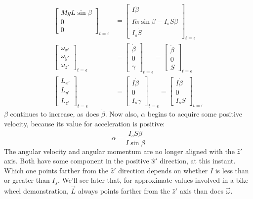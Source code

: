 \documentclass[10pt]{article}
\begin{document}
\begin{align*}
    \begin{bmatrix}
        MgL\sin\beta \\
        0 \\
        0 
    \end{bmatrix}_{t=\epsilon}
    &=
    \begin{bmatrix}
        I\ddot\beta \\
        I\ddot\alpha\sin\beta - I_sS\dot\beta\\
        I_s\dot S 
    \end{bmatrix}_{t=\epsilon}
    \\
    \begin{bmatrix}
        \omega_{x'} \\
        \omega_{y'} \\
        \omega_{z'}
    \end{bmatrix}_{t=\epsilon}
    &=
    \begin{bmatrix}
        \dot\beta \\
        0 \\
        \dot\gamma
    \end{bmatrix}_{t=\epsilon}
    =
    \begin{bmatrix}
        \dot\beta \\
        0 \\
        S
    \end{bmatrix}_{t=\epsilon}
    \\
    \begin{bmatrix}
        L_{x'} \\
        L_{y'} \\
        L_{z'}
    \end{bmatrix}_{t=\epsilon}
    &=
    \begin{bmatrix}
        I\dot\beta \\
        0 \\
        I_s\dot\gamma
    \end{bmatrix}_{t=\epsilon}
    =
    \begin{bmatrix}
        I\dot\beta \\
        0 \\
        I_sS
    \end{bmatrix}_{t=\epsilon}
\end{align*}
$\beta$ continues to increase, as does $\dot\beta$. 
Now also, $\alpha$ begins to acquire some positive velocity, because its value 
for acceleration is positive: 
\begin{equation*}
    \ddot{\alpha} = \frac{I_sS\dot\beta}{I\sin\beta}
\end{equation*}
The angular velocity and angular momentum are no longer 
aligned with the $\hat{z}'$ axis. Both have some component in the 
positive $\hat{x}'$ direction, at this instant. Which one points farther 
from the $\hat{z}'$ direction depends on whether $I$ is less than or greater 
than $I_s$. We'll see later that, for approximate values involved in a 
bike wheel demonstration, $\vec{L}$ always points farther from the $\hat{z}'$ 
axis than does $\vec\omega$.
\end{document}
